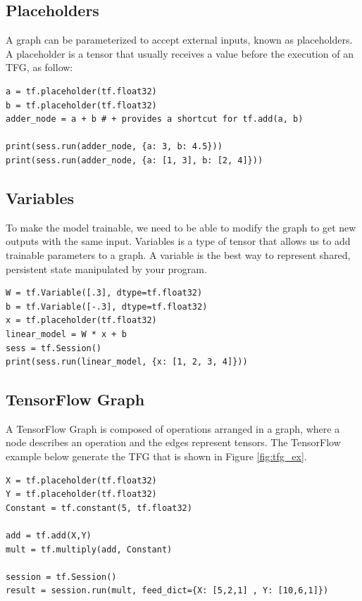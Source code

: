\documentclass[11pt, fleqn]{article}
\begin{document}
\subsection{Placeholders}
A graph can be parameterized to accept external inputs, known as placeholders. A placeholder is a tensor that usually receives a value before the execution of an TFG, as follow: 

\begin{verbatim}
a = tf.placeholder(tf.float32)
b = tf.placeholder(tf.float32)
adder_node = a + b # + provides a shortcut for tf.add(a, b)

print(sess.run(adder_node, {a: 3, b: 4.5}))
print(sess.run(adder_node, {a: [1, 3], b: [2, 4]}))
\end{verbatim}


\subsection{Variables}
To make the model trainable, we need to be able to modify the graph to get new outputs with the same input. Variables is a type of tensor that allows us to add trainable parameters to a graph.
A variable is the best way to represent shared, persistent state manipulated by your program.

\begin{verbatim}
W = tf.Variable([.3], dtype=tf.float32)
b = tf.Variable([-.3], dtype=tf.float32)
x = tf.placeholder(tf.float32)
linear_model = W * x + b
sess = tf.Session()
print(sess.run(linear_model, {x: [1, 2, 3, 4]}))
\end{verbatim}

\subsection{TensorFlow Graph}
A TensorFlow Graph is composed of operations arranged in a graph, where a node describes an operation and the edges represent tensors. The TensorFlow example below generate the TFG that is shown in Figure \ref{fig:tfg_ex}.

\begin{verbatim}
X = tf.placeholder(tf.float32)
Y = tf.placeholder(tf.float32)
Constant = tf.constant(5, tf.float32)

add = tf.add(X,Y)
mult = tf.multiply(add, Constant)

session = tf.Session()
result = session.run(mult, feed_dict={X: [5,2,1] , Y: [10,6,1]})

\end{verbatim}
 
\end{document}
